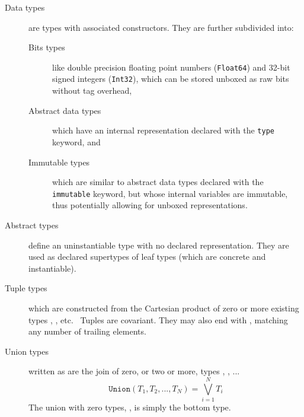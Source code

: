 \documentclass[pldi]{sigplanconf-pldi15}
\begin{document}
\begin{description}

\item[Data types] are types with associated constructors. They
	are further subdivided into:
	\begin{description}
	
	\item[Bits types] like double precision floating point numbers
	(\verb|Float64|) and 32-bit signed integers (\verb|Int32|), which can
	be stored unboxed as raw bits without tag overhead,

	\item[Abstract data types] which have an internal representation
		declared with the \verb|type| keyword, and
		
	\item[Immutable types] which are similar to abstract data types
		declared with the \verb|immutable| keyword, but whose internal
		variables are immutable, thus potentially allowing for unboxed
		representations.

	\end{description}

\item[Abstract types] define an uninstantiable type with no declared
	representation. They are used as declared supertypes of leaf types
	(which are concrete and instantiable).

\item[Tuple types]  which are constructed from the Cartesian
	product of zero or more existing types , ,
	etc.~\cite[Sec. 11.7]{Pierce2002} Tuples are covariant. They may also
        end with , matching any number of trailing elements.

\item[Union types] written as  are the join of zero,
	or two or more, types , , ...~\cite[Sec.
	15.7]{Pierce2002}
	\begin{equation}
		\texttt{Union}(T_1, T_2, ..., T_N) = \bigvee_{i=1}^N T_i 
	\end{equation}
	The union with zero types, , is simply the bottom type.


\end{description}
\end{document}
